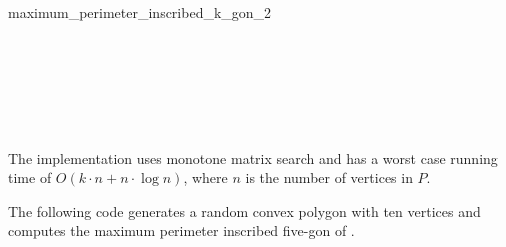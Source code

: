 \begin{ccRefFunction}{maximum_perimeter_inscribed_k_gon_2}
  \ccTagDefaults

  \ccSeeAlso
  \\
  \\
  \\
  \\
  \\
  
  \ccImplementation The implementation uses monotone matrix search
  \cite{akmsw-gamsa-87} and has a worst case running time of $O(k
  \cdot n + n \cdot \log n)$, where $n$ is the number of vertices in
  $P$.

  \ccExample The following code generates a random convex polygon
   with ten vertices and computes the maximum perimeter inscribed
  five-gon of .


\end{ccRefFunction}

